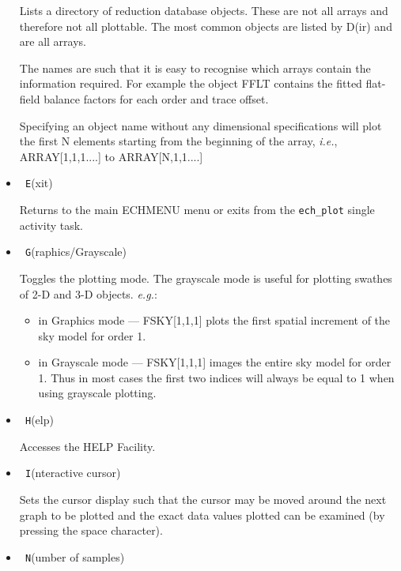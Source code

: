 \documentclass[twoside,11pt]{article}
\renewcommand{\_}{\texttt{\symbol{95}}}
\newcommand{\sunspec}[2]{#1}
\newcommand{\myindex}[1]{\index{#1}}
\newcommand{\sunspec}[2]{#2}
\newcommand{\myindex}[1]{}
\begin{document}
\begin{itemize}
     Lists a directory of reduction database
     objects. These are not all arrays and therefore not all plottable.
     The most common objects are listed by D(ir) and are all arrays.

     The names are such that it is easy to recognise which arrays contain
     the information required. For example the object FFLT contains the
     fitted flat-field balance factors for each order and trace offset.

     Specifying an object name without any dimensional specifications will
     plot the first N elements starting from the beginning of the array,
     {\it{i.e.}}, ARRAY[1,1,1....] to ARRAY[N,1,1....]

\item {\sunspec{\Large\tt}{\bf} E}(xit)

     Returns to the main ECHMENU menu or exits from
     the \verb+ech_plot+ single activity task.

\item {\sunspec{\Large\tt}{\bf} G}(raphics/Grayscale)

     Toggles the plotting mode. The
     grayscale mode is useful for plotting swathes of 2-D and 3-D objects.
     {\it{e.g.}}:

     \begin{itemize}

     \item in Graphics mode --- FSKY[1,1,1] plots the first spatial
            increment of the sky model for order 1.

     \item in Grayscale mode --- FSKY[1,1,1] images the entire sky model
            for order 1.  Thus in most cases the first two indices will
            always be equal to 1 when using grayscale plotting.

     \end{itemize}

\item {\sunspec{\Large\tt}{\bf} H}(elp)

     Accesses the HELP Facility.

\item {\sunspec{\Large\tt}{\bf} I}(nteractive cursor)

     Sets the cursor display such that
     the cursor may be moved around the next graph to be plotted and the
     exact data values plotted can be examined (by pressing the space
     character).

\item {\sunspec{\Large\tt}{\bf} N}(umber of samples)
     \myindex{Plotter!subsets}


\end{itemize}
\end{document}
